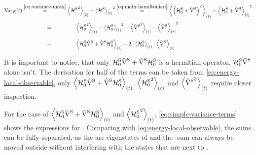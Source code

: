\begin{equation}
    \label{eq:variance-split}
    \begin{split}
        \varianceOft &\stackrel{\ref{eq:variance-main}}{=} \timeExpectationVal{{\pictureHamiltonian[\schroedingerPicture]}^2} - {\timeExpectationVal{\pictureHamiltonian[\schroedingerPicture]}}^2
        \stackrel{\ref{eq:main-hamiltonian}}{=} \timeExpectationVal{\left(\HzeroHamiltonian[\schroedingerPicture] + \Vhamiltonian[\schroedingerPicture]\right)^2} - {\timeExpectationVal{\HzeroHamiltonian[\schroedingerPicture] + \Vhamiltonian[\schroedingerPicture]}}^2
        \\&\stackrel{\phantom{\ref{eq:main-hamiltonian}}}{=}
        \timeExpectationVal{{\HzeroHamiltonian[\schroedingerPicture]}^2} - {\timeExpectationVal{\HzeroHamiltonian[\schroedingerPicture]}}^2
        +
        \timeExpectationVal{{\Vhamiltonian[\schroedingerPicture]}^2} - {\timeExpectationVal{\Vhamiltonian[\schroedingerPicture]}}^2
        \\&\stackrel{\phantom{\ref{eq:main-hamiltonian}}}{+}
        \timeExpectationVal{\HzeroHamiltonian[\schroedingerPicture]\Vhamiltonian[\schroedingerPicture] + \Vhamiltonian[\schroedingerPicture]\HzeroHamiltonian[\schroedingerPicture]}
        -        2\cdot 
        \timeExpectationVal{\HzeroHamiltonian[\schroedingerPicture]}\cdot \timeExpectationVal{\Vhamiltonian[\schroedingerPicture]}
    \end{split}
\end{equation}

It is important to notice, that only $\HzeroHamiltonian[\schroedingerPicture]\Vhamiltonian[\schroedingerPicture] + \Vhamiltonian[\schroedingerPicture]\HzeroHamiltonian[\schroedingerPicture]$ is a hermitian operator, $\HzeroHamiltonian[\schroedingerPicture]\Vhamiltonian[\schroedingerPicture]$ alone isn't.
The derivation for half of the terms can be taken from \autoref{eq:energy-local-observable}, only $\timeExpectationVal{\HzeroHamiltonian[\schroedingerPicture]\Vhamiltonian[\schroedingerPicture] + \Vhamiltonian[\schroedingerPicture]\HzeroHamiltonian[\schroedingerPicture]}$, $\timeExpectationVal{{\HzeroHamiltonian[\schroedingerPicture]}^2}$ and $\timeExpectationVal{{\Vhamiltonian[\schroedingerPicture]}^2}$ require closer inspection.

For the case of $\timeExpectationVal{\HzeroHamiltonian[\schroedingerPicture]\Vhamiltonian[\schroedingerPicture] + \Vhamiltonian[\schroedingerPicture]\HzeroHamiltonian[\schroedingerPicture]}$ and $\timeExpectationVal{{\HzeroHamiltonian[\schroedingerPicture]}^2}$, \autoref{eq:simple-variance-terms} shows the expressions for . Comparing with \autoref{eq:energy-local-observable}, the sums can be fully separated, as the \ketN[N] are eigenstates of \HzeroHamiltonian[\schroedingerPicture] and the \HzeroHamiltonian[\schroedingerPicture]-sum can always be moved outside without interfering with the states that are next to \Vhamiltonian[\schroedingerPicture].


